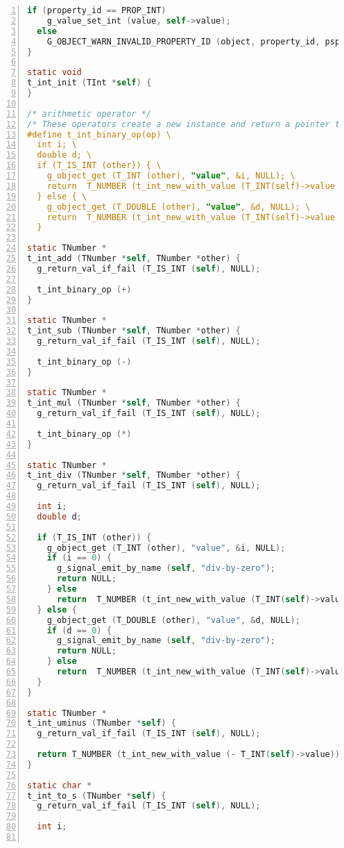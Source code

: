 \begin{lstlisting}[language=C, numbers=left]
  if (property_id == PROP_INT)
    g_value_set_int (value, self->value);
  else
    G_OBJECT_WARN_INVALID_PROPERTY_ID (object, property_id, pspec);
}

static void
t_int_init (TInt *self) {
}

/* arithmetic operator */
/* These operators create a new instance and return a pointer to it. */
#define t_int_binary_op(op) \
  int i; \
  double d; \
  if (T_IS_INT (other)) { \
    g_object_get (T_INT (other), "value", &i, NULL); \
    return  T_NUMBER (t_int_new_with_value (T_INT(self)->value op i)); \
  } else { \
    g_object_get (T_DOUBLE (other), "value", &d, NULL); \
    return  T_NUMBER (t_int_new_with_value (T_INT(self)->value op (int) d)); \
  }

static TNumber *
t_int_add (TNumber *self, TNumber *other) {
  g_return_val_if_fail (T_IS_INT (self), NULL);

  t_int_binary_op (+)
}

static TNumber *
t_int_sub (TNumber *self, TNumber *other) {
  g_return_val_if_fail (T_IS_INT (self), NULL);

  t_int_binary_op (-)
}

static TNumber *
t_int_mul (TNumber *self, TNumber *other) {
  g_return_val_if_fail (T_IS_INT (self), NULL);

  t_int_binary_op (*)
}

static TNumber *
t_int_div (TNumber *self, TNumber *other) {
  g_return_val_if_fail (T_IS_INT (self), NULL);

  int i;
  double d;

  if (T_IS_INT (other)) {
    g_object_get (T_INT (other), "value", &i, NULL);
    if (i == 0) {
      g_signal_emit_by_name (self, "div-by-zero");
      return NULL;
    } else
      return  T_NUMBER (t_int_new_with_value (T_INT(self)->value / i));
  } else {
    g_object_get (T_DOUBLE (other), "value", &d, NULL);
    if (d == 0) {
      g_signal_emit_by_name (self, "div-by-zero");
      return NULL;
    } else
      return  T_NUMBER (t_int_new_with_value (T_INT(self)->value / (int)  d));
  }
}

static TNumber *
t_int_uminus (TNumber *self) {
  g_return_val_if_fail (T_IS_INT (self), NULL);

  return T_NUMBER (t_int_new_with_value (- T_INT(self)->value));
}

static char *
t_int_to_s (TNumber *self) {
  g_return_val_if_fail (T_IS_INT (self), NULL);

  int i;


\end{lstlisting}
